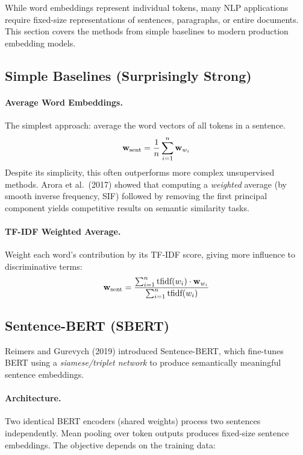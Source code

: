 While word embeddings represent individual tokens, many NLP applications
require fixed-size representations of sentences, paragraphs, or entire
documents.  This section covers the methods from simple baselines to modern
production embedding models.

\subsection{Simple Baselines (Surprisingly Strong)}

\paragraph{Average Word Embeddings.}
The simplest approach: average the word vectors of all tokens in a sentence.
\[
    \mathbf{w}_{\text{sent}} = \frac{1}{n} \sum_{i=1}^{n} \mathbf{w}_{w_i}
\]
Despite its simplicity, this often outperforms more complex unsupervised
methods.  Arora et al.\ (2017) showed that computing a \emph{weighted}
average (by smooth inverse frequency, SIF) followed by removing the first
principal component yields competitive results on semantic similarity tasks.

\paragraph{TF-IDF Weighted Average.}
Weight each word's contribution by its TF-IDF score, giving more influence to
discriminative terms:
\[
    \mathbf{w}_{\text{sent}} = \frac{\sum_{i=1}^{n}
                               \text{tfidf}(w_i) \cdot \mathbf{w}_{w_i}}
                              {\sum_{i=1}^{n} \text{tfidf}(w_i)}
\]

\subsection{Sentence-BERT (SBERT)}

Reimers and Gurevych (2019) introduced Sentence-BERT, which fine-tunes BERT
using a \emph{siamese/triplet network} to produce semantically meaningful
sentence embeddings.

\paragraph{Architecture.}
Two identical BERT encoders (shared weights) process two sentences
independently.  Mean pooling over token outputs produces fixed-size
sentence embeddings.  The objective depends on the training data:

